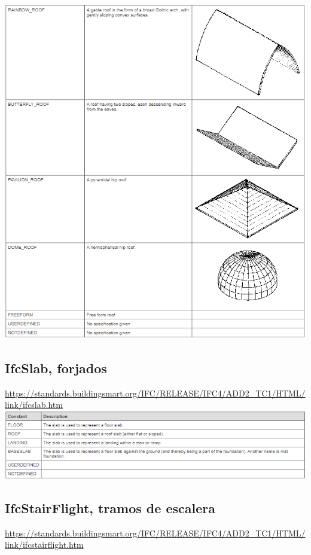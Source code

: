 \documentclass[spanish,12pt,a4paper,final,oneside]{book}
\begin{document}
\\ \includegraphics[width=\textwidth]{Definicion de IfcRoofTypeEnum-3}

\subsection{IfcSlab, forjados}
\url{https://standards.buildingsmart.org/IFC/RELEASE/IFC4/ADD2_TC1/HTML/link/ifcslab.htm}
\\ \includegraphics[width=\textwidth]{Definicion de IfcSlabTypeEnum}

\subsection{IfcStairFlight, tramos de escalera}
\url{https://standards.buildingsmart.org/IFC/RELEASE/IFC4/ADD2_TC1/HTML/link/ifcstairflight.htm}
\end{document}
